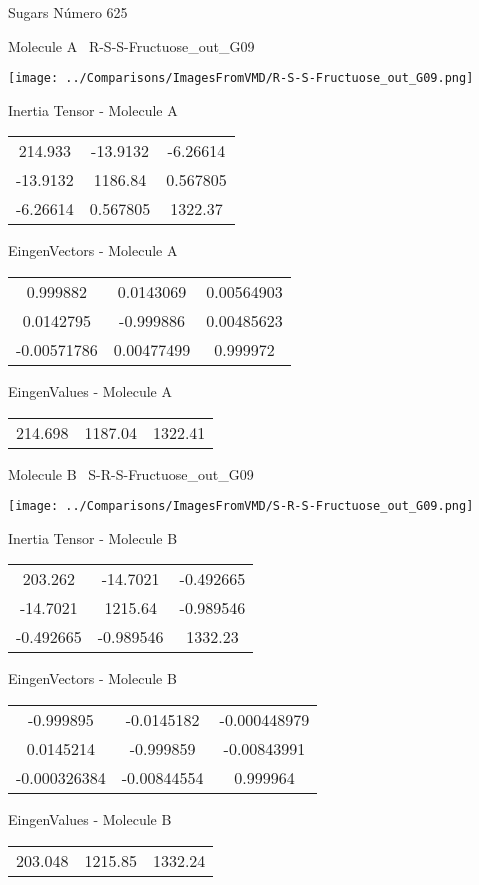 \vtab[-3cm]
\begin{center}
{\large Sugars \tab Número 625}
\end{center}
\begin{multicols}{2}
\begin{center}

Molecule A \
R-S-S-Fructuose\_out\_G09

\texttt{[image: ../Comparisons/ImagesFromVMD/R-S-S-Fructuose\_out\_G09.png]}

Inertia Tensor - Molecule A \\
\begin{tabular}{|c c c|}
214.933	 & 	-13.9132	 & 	-6.26614	 \\
-13.9132	 & 	1186.84	 & 	0.567805	 \\
-6.26614	 & 	0.567805	 & 	1322.37
\end{tabular}

\vtab
 EingenVectors - Molecule A     \\
\begin{tabular}{|c c c|}
0.999882	 & 	0.0143069	 & 	0.00564903	 \\
0.0142795	 & 	-0.999886	 & 	0.00485623	 \\
-0.00571786	 & 	0.00477499	 & 	0.999972
\end{tabular}

\vtab
 EingenValues - Molecule A     \\
\begin{tabular}{|c c c|}
214.698	 & 	1187.04	 & 	1322.41	 \\
\end{tabular}
\columnbreak

Molecule B \
S-R-S-Fructuose\_out\_G09

\texttt{[image: ../Comparisons/ImagesFromVMD/S-R-S-Fructuose\_out\_G09.png]}

Inertia Tensor - Molecule B \\
\begin{tabular}{|c c c|}
203.262	 & 	-14.7021	 & 	-0.492665	 \\
-14.7021	 & 	1215.64	 & 	-0.989546	 \\
-0.492665	 & 	-0.989546	 & 	1332.23
\end{tabular}

\vtab
 EingenVectors - Molecule B     \\
\begin{tabular}{|c c c|}
-0.999895	 & 	-0.0145182	 & 	-0.000448979	 \\
0.0145214	 & 	-0.999859	 & 	-0.00843991	 \\
-0.000326384	 & 	-0.00844554	 & 	0.999964
\end{tabular}

\vtab
 EingenValues - Molecule B     \\
\begin{tabular}{|c c c|}
203.048	 & 	1215.85	 & 	1332.24	 \\
\end{tabular}

\end{center}
\end{multicols}

